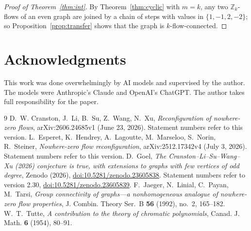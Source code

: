 \documentclass[11pt]{article}
\theoremstyle{definition}
\newcommand{\Z}{\mathbb{Z}}
\begin{document}
\begin{proof}[Proof of Theorem~\ref{thm:int}]
By Theorem~\ref{thm:cyclic} with $m=k$, any two $\Z_k$-flows of an even graph are joined by a chain of steps
with values in $\{1,-1,2,-2\}$; so Proposition~\ref{prop:transfer} shows that the graph is $k$-flow-connected.
\end{proof}


\section*{Acknowledgments}
This work was done overwhelmingly by AI models and supervised by the author. The models were Anthropic's Claude and
OpenAI's ChatGPT. The author takes full responsibility for the paper.

\begin{thebibliography}{9}\small
{} D.~W. Cranston, J.~Li, B.~Su, Z.~Wang, N.~Xu, \emph{Reconfiguration of nowhere-zero flows},
arXiv:2606.24685v1 (June 23, 2026). Statement numbers refer to this version.
 L.~Esperet, K.~Hendrey, A.~Lagoutte, M.~Marseloo, S.~Norin, R.~Steiner, \emph{Nowhere-zero flow
reconfiguration}, arXiv:2512.17342v4 (July 3, 2026). Statement numbers refer to this version.
 D.~Goel, \emph{The Cranston--Li--Su--Wang--Xu (2026) conjecture is true, with extensions to graphs with
few vertices of odd degree}, Zenodo (2026),
\href{https://doi.org/10.5281/zenodo.23605838}{doi:10.5281/zenodo.23605838}. Statement numbers refer to version 2.30,
\href{https://doi.org/10.5281/zenodo.23605839}{doi:10.5281/zenodo.23605839}.
 F.~Jaeger, N.~Linial, C.~Payan, M.~Tarsi, \emph{Group connectivity of graphs---a nonhomogeneous
analogue of nowhere-zero flow properties}, J. Combin. Theory Ser.~B \textbf{56} (1992), no.~2, 165--182.
 W.~T.~Tutte, \emph{A contribution to the theory of chromatic polynomials}, Canad. J. Math.
\textbf{6} (1954), 80--91.
\end{thebibliography}
\end{document}
